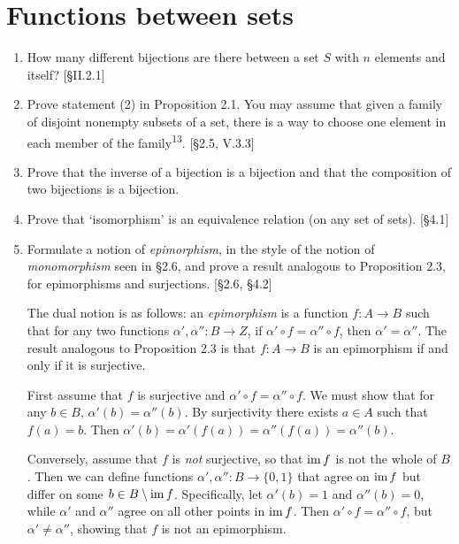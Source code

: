 \section{Functions between sets}
\begin{enumerate}
    \item How many different bijections are there between a set $S$ with $n$ elements and itself? [\S II.2.1]

    \item Prove statement (2) in Proposition 2.1. You may assume that given a family of disjoint nonempty subsets of a set, there is a way to choose one element in each member of the family\textsuperscript{13}. [\S2.5, V.3.3]

    \item Prove that the inverse of a bijection is a bijection and that the composition of two bijections is a bijection.

    \item Prove that `isomorphism' is an equivalence relation (on any set of sets). [\S4.1]

    \item Formulate a notion of \textit{epimorphism}, in the style of the notion of \textit{monomorphism} seen in \S2.6, and prove a result analogous to Proposition 2.3, for epimorphisms and surjections. [\S2.6, \S4.2]

          \begin{solution}
              The dual notion is as follows: an \textit{epimorphism} is a function $f: A \to B$ such that for any two functions $\alpha', \alpha'': B \to Z$, if $\alpha' \circ f = \alpha'' \circ f$, then $\alpha' = \alpha''$.
              The result analogous to Proposition 2.3 is that $f: A \to B$ is an epimorphism if and only if it is surjective.

              First assume that $f$ is surjective and $\alpha' \circ f = \alpha'' \circ f$. We must show that for any $b \in B$, $\alpha'(b) = \alpha''(b)$. By surjectivity there exists $a \in A$ such that $f(a) = b$. Then $\alpha'(b) = \alpha'(f(a)) = \alpha''(f(a)) = \alpha''(b)$.

              Conversely, assume that $f$ is \emph{not} surjective, so that $\operatorname{im} f$ is not the whole of $B$. Then we can define functions $\alpha',\alpha'': B \to \{0,1\}$ that agree on $\operatorname{im} f$ but differ on some $b \in B \setminus \operatorname{im} f$. Specifically, let $\alpha'(b) = 1$ and $\alpha''(b) = 0$, while $\alpha'$ and $\alpha''$ agree on all other points in $\operatorname{im} f$. Then $\alpha' \circ f = \alpha'' \circ f$, but $\alpha' \neq \alpha''$, showing that $f$ is not an epimorphism.
          \end{solution}


\end{enumerate}
